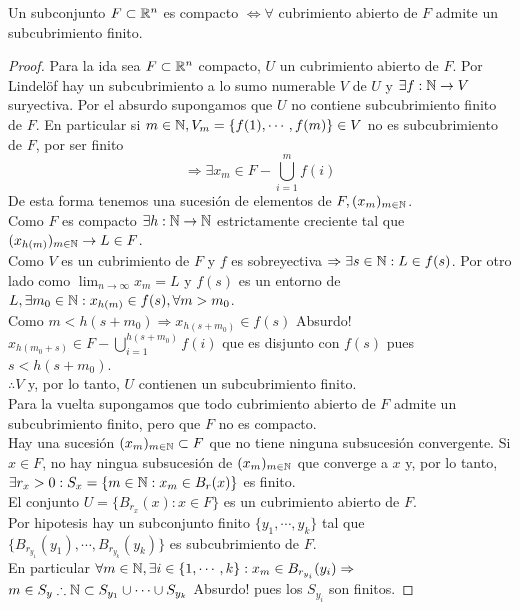 \begin{corollary}
  Un subconjunto $F \subset \mathbb{R}^n$ es compacto $\iff \forall$ cubrimiento abierto de $F$ admite un subcubrimiento finito.
  \begin{proof}
    Para la ida sea $F \subset \mathbb{R}^n$ compacto, $U$ un cubrimiento abierto de $F$. Por Lindelöf hay un subcubrimiento a lo sumo numerable $V$ de $U$ y $\exists f: \mathbb{N} \to V$ suryectiva.
    Por el absurdo supongamos que $U$ no contiene subcubrimiento finito de $F$.
    En particular si $m \in \mathbb{N}, V_m = \{ f(1), \cdots, f(m) \} \in V$ no es subcubrimiento de $F$, por ser finito
    \begin{equation}
      \Rightarrow \exists x_m \in F - \bigcup_{i = 1}^m f(i)
    \end{equation} De esta forma tenemos una sucesión de elementos de $F, (x_m)_{m \in \mathbb{N}}$. \\
    Como $F$ es compacto $\exists h: \mathbb{N} \to \mathbb{N}$ estrictamente creciente tal que $(x_{h(m)})_{m \in \mathbb{N}} \to L \in F$. \\
    Como $V$ es un cubrimiento de $F$ y $f$ es sobreyectiva $\Rightarrow \exists s \in \mathbb{N} : L \in f(s)$.
    Por otro lado como $\lim_{n \to \infty} x_m = L$ y $f(s)$ es un entorno de $L, \exists m_0 \in \mathbb{N} : x_{h(m)} \in f(s), \forall m > m_0$. \\
    Como $m < h(s + m_0) \Rightarrow x_{h(s+m_0)} \in f(s)$ Absurdo! \\
    $x_{h(m_0 + s)} \in F - \bigcup_{i=1}^{h(s+m_0)} f(i)$ que es disjunto con $f(s)$ pues $s < h(s + m_0)$. \\
    $\therefore V$ y, por lo tanto, $U$ contienen un subcubrimiento finito. \\

    Para la vuelta supongamos que todo cubrimiento abierto de $F$ admite un
    subcubrimiento finito, pero que $F$ no es compacto. \\ Hay una sucesión
    $(x_m)_{m \in \mathbb{N}} \subset F$ que no tiene ninguna subsucesión convergente. Si
    $x \in F$, no hay ningua subsucesión de $(x_m)_{m \in \mathbb{N}}$ que converge a $x$
    y, por lo tanto, $\exists r_x > 0 : S_x = \{ m \in \mathbb{N} : x_m \in B_r(x) \}$ es
    finito. \\ El conjunto $U = \{ B_{r_x}(x) : x \in F \}$ es un cubrimiento
    abierto de $F$. \\ Por hipotesis hay un subconjunto finito $\{ y_1, \cdots,
      y_k\}$ tal que $\{ B_{r_{y_1}}(y_1), \cdots, B_{r_{y_k}}(y_k) \}$ es
    subcubrimiento de $F$. \\ En particular $\forall m \in \mathbb{N}, \exists i \in \{ 1,
      \cdots, k \} : x_m \in B_{r_{y_i}}(y_i) \Rightarrow$ \\ $m \in S_y \therefore
      \mathbb{N} \subset S_{y_1} \cup \cdots \cup S_{y_k}$ Absurdo! pues los $S_{y_i}$ son
    finitos.
  \end{proof}
\end{corollary}

